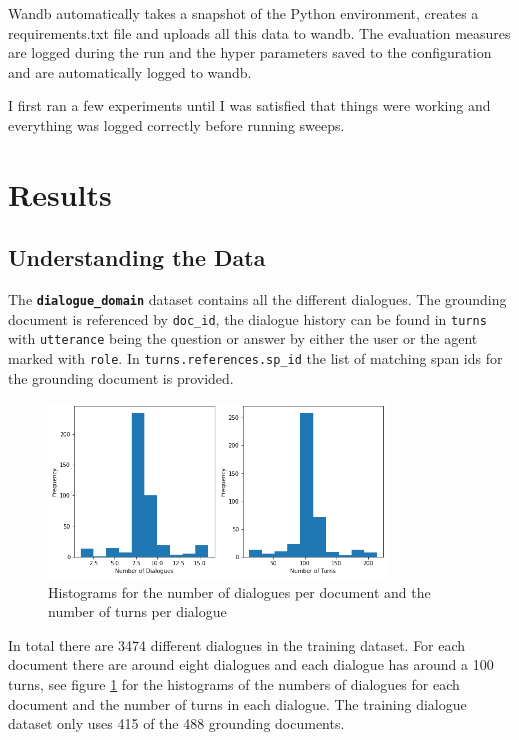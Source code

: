 \documentclass[11pt]{article}
\begin{document}
    Wandb automatically takes a snapshot of the Python environment, creates a requirements.txt file and uploads all this
    data to wandb. The evaluation measures are logged during the run and the hyper parameters saved to the configuration
    and are automatically logged to wandb.

    I first ran a few experiments until I was satisfied that things were working and everything was logged correctly before
    running sweeps.


    \section{Results}\label{sec:results}

    \subsection{Understanding the Data}\label{subsec:understanding-the-data-results}

    The \textbf{\texttt{dialogue\_domain}} dataset contains all the different dialogues. The grounding document is referenced
    by \texttt{doc\_id}, the dialogue history can be found in \texttt{turns} with \texttt{utterance} being the question
    or answer by either the user or the agent marked with \texttt{role}. In \texttt{turns.references.sp\_id} the list of
    matching span ids for the grounding document is provided.

    \begin{figure}[h]
        \centering
        \includegraphics[width=0.8\textwidth]{number_of_dialogues_and_turns}
        \caption{Histograms for the number of dialogues per document and the number of turns per dialogue}
        \label{fig:histogram-dialogue-and-turns}
    \end{figure}

    In total there are 3474 different dialogues in the training dataset. For each document there are around eight dialogues and
    each dialogue has around a 100 turns, see figure \ref{fig:histogram-dialogue-and-turns} for the histograms of the numbers of
    dialogues for each document and the number of turns in each dialogue.
    The training dialogue dataset only uses 415 of the 488 grounding documents.\\
\end{document}
